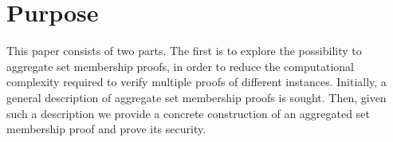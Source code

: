 






\section*{Purpose}
This paper consists of two parts. The first is to explore the possibility to aggregate set membership proofs, in order to reduce the computational complexity required to verify multiple proofs of different instances. Initially, a general description of aggregate set membership proofs is sought. Then, given such a description we provide a concrete construction of an aggregated set membership proof and prove its security.


